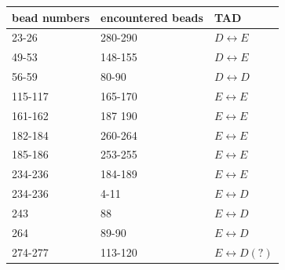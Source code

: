 \documentclass[12pt]{book}
\begin{document}
\begin{table}[H]\label{table_peaksOfTheEncounterDataOneSided}
\begin{tabular}{l l l}
bead numbers & encountered beads & TAD\\
\hline
23-26   & 280-290 & $D\leftrightarrow E$\\
49-53   & 148-155 & $D\leftrightarrow E$\\
56-59   & 80-90   & $D\leftrightarrow D$\\
115-117 & 165-170 & $E\leftrightarrow E$\\
161-162 & 187 190 & $E\leftrightarrow E$\\
182-184 & 260-264 & $E\leftrightarrow E$\\
185-186 & 253-255 & $E\leftrightarrow E$\\
234-236 & 184-189 & $E\leftrightarrow E$\\
234-236 & 4-11    & $E\leftrightarrow D$\\
243     & 88      & $E\leftrightarrow D$\\
264     & 89-90   & $E\leftrightarrow D$\\
274-277 & 113-120 & $E\leftrightarrow D(?)$
\end{tabular}
\end{table}
\end{document}
